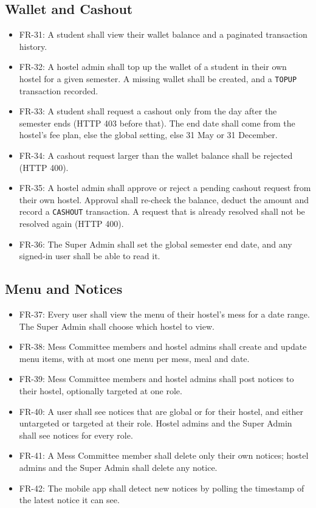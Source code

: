 \documentclass{scrreprt}
\begin{document}
\subsection{Wallet and Cashout}
\begin{itemize}
    \item FR-31: A student shall view their wallet balance and a paginated
    transaction history.
    \item FR-32: A hostel admin shall top up the wallet of a student in their
    own hostel for a given semester. A missing wallet shall be created, and
    a \texttt{TOPUP} transaction recorded.
    \item FR-33: A student shall request a cashout only from the day after
    the semester ends (HTTP 403 before that). The end date shall come from
    the hostel's fee plan, else the global setting, else 31 May or
    31 December.
    \item FR-34: A cashout request larger than the wallet balance shall be
    rejected (HTTP 400).
    \item FR-35: A hostel admin shall approve or reject a pending cashout
    request from their own hostel. Approval shall re-check the balance,
    deduct the amount and record a \texttt{CASHOUT} transaction. A request
    that is already resolved shall not be resolved again (HTTP 400).
    \item FR-36: The Super Admin shall set the global semester end date, and
    any signed-in user shall be able to read it.
\end{itemize}

\subsection{Menu and Notices}
\begin{itemize}
    \item FR-37: Every user shall view the menu of their hostel's mess for a
    date range. The Super Admin shall choose which hostel to view.
    \item FR-38: Mess Committee members and hostel admins shall create and
    update menu items, with at most one menu per mess, meal and date.
    \item FR-39: Mess Committee members and hostel admins shall post notices
    to their hostel, optionally targeted at one role.
    \item FR-40: A user shall see notices that are global or for their
    hostel, and either untargeted or targeted at their role. Hostel admins
    and the Super Admin shall see notices for every role.
    \item FR-41: A Mess Committee member shall delete only their own
    notices; hostel admins and the Super Admin shall delete any notice.
    \item FR-42: The mobile app shall detect new notices by polling the
    timestamp of the latest notice it can see.
\end{itemize}
\end{document}
